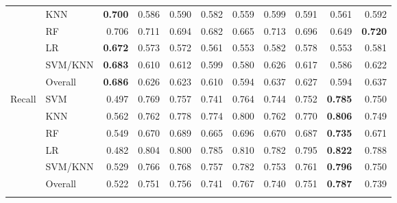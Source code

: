 \begin{table}[pos=!htbp]
{\begin{tabular}{llrrrrrrrrr}
 & KNN & \textbf{0.700} & 0.586 & 0.590 & 0.582 & 0.559 & 0.599 & 0.591 & 0.561 & 0.592 \\
 & RF & 0.706 & 0.711 & 0.694 & 0.682 & 0.665 & 0.713 & 0.696 & 0.649 & \textbf{0.720} \\
 & LR & \textbf{0.672} & 0.573 & 0.572 & 0.561 & 0.553 & 0.582 & 0.578 & 0.553 & 0.581 \\
 & SVM/KNN & \textbf{0.683} & 0.610 & 0.612 & 0.599 & 0.580 & 0.626 & 0.617 & 0.586 & 0.622 \\
 & Overall & \textbf{0.686} & 0.626 & 0.623 & 0.610 & 0.594 & 0.637 & 0.627 & 0.594 & 0.637 \\
\addlinespace[3pt]
Recall & SVM & 0.497 & 0.769 & 0.757 & 0.741 & 0.764 & 0.744 & 0.752 & \textbf{0.785} & 0.750 \\
 & KNN & 0.562 & 0.762 & 0.778 & 0.774 & 0.800 & 0.762 & 0.770 & \textbf{0.806} & 0.749 \\
 & RF & 0.549 & 0.670 & 0.689 & 0.665 & 0.696 & 0.670 & 0.687 & \textbf{0.735} & 0.671 \\
 & LR & 0.482 & 0.804 & 0.800 & 0.785 & 0.810 & 0.782 & 0.795 & \textbf{0.822} & 0.788 \\
 & SVM/KNN & 0.529 & 0.766 & 0.768 & 0.757 & 0.782 & 0.753 & 0.761 & \textbf{0.796} & 0.750 \\
 & Overall & 0.522 & 0.751 & 0.756 & 0.741 & 0.767 & 0.740 & 0.751 & \textbf{0.787} & 0.739 \\
\addlinespace[3pt]\bottomrule\end{tabular}}
\end{table}
